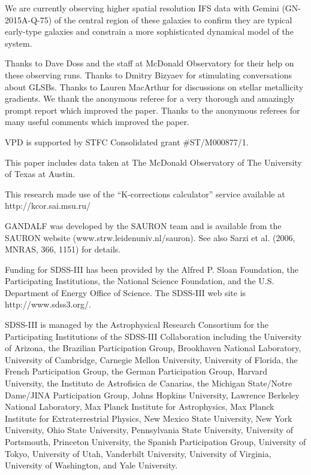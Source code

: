 \documentclass[12pt,preprint]{aastex}
\begin{document}
We are currently observing higher spatial resolution IFS data with Gemini (GN-2015A-Q-75) of the central region of these galaxies to confirm they are typical early-type galaxies and constrain a more sophisticated dynamical model of the system.

\acknowledgments
Thanks to Dave Doss and the staff at McDonald Observatory for their help on these observing runs. Thanks to Dmitry Bizyaev for stimulating conversations about GLSBs. Thanks to Lauren MacArthur for discussions on stellar metallicity gradients. We thank the anonymous referee for a very thorough and amazingly prompt report which improved the paper. Thanks to the anonymous referees for many useful comments which improved the paper.

VPD is supported by STFC Consolidated grant \#ST/M000877/1.

This paper includes data taken at The McDonald Observatory of The University of Texas at Austin.

This research made use of the ``K-corrections calculator'' service available at http://kcor.sai.msu.ru/

GANDALF was developed by the SAURON team and is available from the SAURON website (www.strw.leidenuniv.nl/sauron). See also Sarzi et al. (2006, MNRAS, 366, 1151) for details.

Funding for SDSS-III has been provided by the Alfred P. Sloan Foundation, the Participating Institutions, the National Science Foundation, and the U.S. Department of Energy Office of Science. The SDSS-III web site is http://www.sdss3.org/.

SDSS-III is managed by the Astrophysical Research Consortium for the Participating Institutions of the SDSS-III Collaboration including the University of Arizona, the Brazilian Participation Group, Brookhaven National Laboratory, University of Cambridge, Carnegie Mellon University, University of Florida, the French Participation Group, the German Participation Group, Harvard University, the Instituto de Astrofisica de Canarias, the Michigan State/Notre Dame/JINA Participation Group, Johns Hopkins University, Lawrence Berkeley National Laboratory, Max Planck Institute for Astrophysics, Max Planck Institute for Extraterrestrial Physics, New Mexico State University, New York University, Ohio State University, Pennsylvania State University, University of Portsmouth, Princeton University, the Spanish Participation Group, University of Tokyo, University of Utah, Vanderbilt University, University of Virginia, University of Washington, and Yale University.
\end{document}

